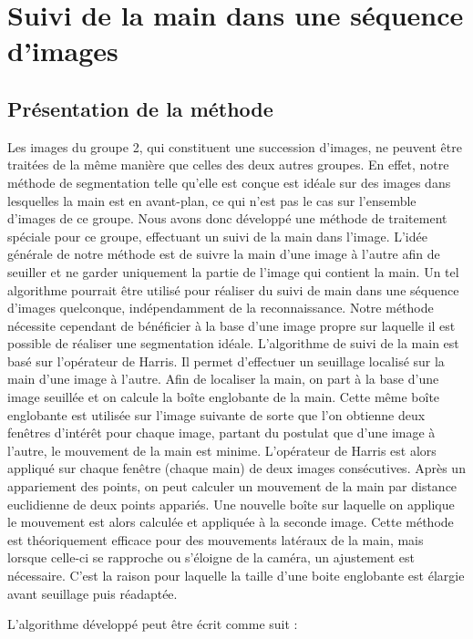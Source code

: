 \section{Suivi de la main dans une séquence d’images}
\subsection{Présentation de la méthode}

Les images du groupe 2, qui constituent une succession d’images, ne peuvent être traitées de la même manière que celles des deux autres groupes. En effet, notre méthode de segmentation telle qu’elle est conçue est idéale sur des images dans lesquelles la main est en avant-plan, ce qui n’est pas le cas sur l’ensemble d’images de ce groupe.
	Nous avons donc développé une méthode de traitement spéciale pour ce groupe, effectuant un suivi de la main dans l’image. L’idée générale de notre méthode est de suivre la main d’une image à l’autre afin de seuiller et ne garder uniquement la partie de l’image qui contient la main. Un tel algorithme pourrait être utilisé pour réaliser du suivi de main dans une séquence d’images quelconque, indépendamment de la reconnaissance. Notre méthode nécessite cependant de bénéficier à la base d’une image propre sur laquelle il est possible de réaliser une segmentation idéale.
	L’algorithme de suivi de la main est basé sur l’opérateur de Harris. Il permet d’effectuer un seuillage localisé sur la main d’une image à l’autre. Afin de localiser la main, on part à la base d’une image seuillée et on calcule la boîte englobante de la main. Cette même boîte englobante est utilisée sur l’image suivante de sorte que l’on obtienne deux fenêtres d’intérêt pour chaque image, partant du postulat que d’une image à l’autre, le mouvement de la main est minime. L’opérateur de Harris est alors appliqué sur chaque fenêtre (chaque main) de deux images consécutives. Après un appariement des points, on peut calculer un mouvement de la main par distance euclidienne de deux points appariés. Une nouvelle boîte sur laquelle on applique le mouvement est alors calculée et appliquée à la seconde image. Cette méthode est théoriquement efficace pour des mouvements latéraux de la main, mais lorsque celle-ci se rapproche ou s’éloigne de la caméra, un ajustement est nécessaire. C’est la raison pour laquelle la taille d’une boite englobante est élargie avant seuillage puis réadaptée.

L’algorithme développé peut être écrit comme suit :


